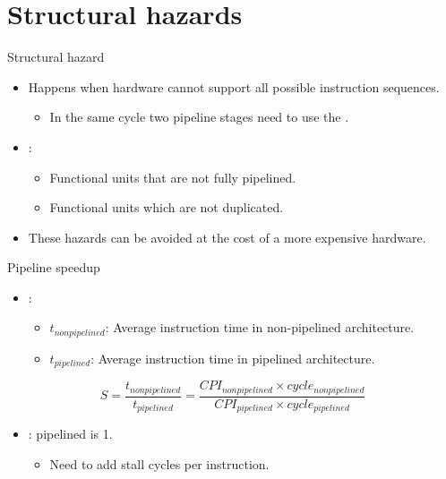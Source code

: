 \section{Structural hazards}

\begin{frame}[t]{Structural hazard}
\begin{itemize}
  \item Happens when hardware \alert{cannot} support
        all possible instruction sequences.
    \begin{itemize} 
      \item In the same cycle two pipeline stages
            need to use the .
    \end{itemize}

  \item {}:
    \begin{itemize}
      \item Functional units that are not fully pipelined.
      \item Functional units which are not duplicated.
    \end{itemize}

  \item These hazards can be avoided at the cost of a more
        expensive hardware.
\end{itemize}
\end{frame}

\begin{frame}[t]{Pipeline speedup}
\begin{itemize}
  \item {}:
    \begin{itemize}
      \item $t_{nonpipelined}$: Average instruction time in non-pipelined architecture.
      \item $t_{pipelined}$: Average instruction time in pipelined architecture.
    \end{itemize}
\end{itemize}
\[
S = 
\frac{t_{nonpipelined}}{t_{pipelined}} =
\frac{CPI_{nonpipelined} \times cycle_{nonpipelined}}{CPI_{pipelined} \times cycle_{pipelined}}
\]
\begin{itemize}
  \item {}: pipelined  is 1.
    \begin{itemize}
      \item Need to add stall cycles per instruction.
    \end{itemize}
\end{itemize}
\end{frame}

